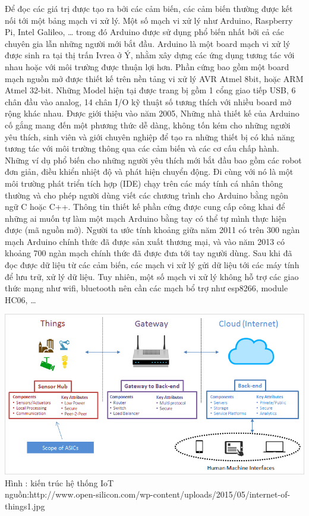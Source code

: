 Để đọc các giá trị được tạo ra bởi các cảm biến, các cảm biến thường được kết nối tới một bảng mạch vi xử lý. Một số mạch vi xử lý như Arduino, Raspberry Pi, Intel Galileo, … trong đó Arduino được sử dụng phổ biến nhất bởi cả các chuyên gia lẫn những người mới bắt đầu. Arduino là một board mạch vi xử lý được sinh ra tại thị trấn Ivrea ở Ý, nhằm xây dựng các ứng dụng tương tác với nhau hoặc với môi trường được thuận lợi hơn. Phần cứng bao gồm một board mạch nguồn mở được thiết kế trên nền tảng vi xử lý AVR Atmel 8bit, hoặc ARM Atmel 32-bit. Những Model hiện tại được trang bị gồm 1 cổng giao tiếp USB, 6 chân đầu vào analog, 14 chân I/O kỹ thuật số tương thích với nhiều board mở rộng khác nhau. Được giới thiệu vào năm 2005, Những nhà thiết kế của Arduino cố gắng mang đến một phương thức dễ dàng, không tốn kém cho những người yêu thích, sinh viên và giới chuyên nghiệp để tạo ra những thiết bị có khả năng tương tác với môi trường thông qua các cảm biến và các cơ cấu chấp hành. Những ví dụ phổ biến cho những người yêu thích mới bắt đầu bao gồm các robot đơn giản, điều khiển nhiệt độ và phát hiện chuyển động. Đi cùng với nó là một môi trường phát triển tích hợp (IDE) chạy trên các máy tính cá nhân thông thường và cho phép người dùng viết các chương trình cho Arduino bằng ngôn ngữ C hoặc C++. Thông tin thiết kế phần cứng được cung cấp công khai để những ai muốn tự làm một mạch Arduino bằng tay có thể tự mình thực hiện được (mã nguồn mở). Người ta ước tính khoảng giữa năm 2011 có trên 300 ngàn mạch Arduino chính thức đã được sản xuất thương mại, và vào năm 2013 có khoảng 700 ngàn mạch chính thức đã được đưa tới tay người dùng. 
Sau khi đã đọc được dữ liệu từ các cảm biến, các mạch vi xử lý gửi dữ liệu tới các máy tính để lưu trữ, xử lý dữ liệu. Tuy nhiên, một số mạch vi xử lý không hỗ trợ các giao thức mạng như wifi, bluetooth nên cần các mạch bổ trợ như esp8266, module HC06, …

\begin{center}
	\includegraphics[scale=0.6]{image/internet-of-things1}
	Hình  : kiến trúc hệ thống IoT \\
	nguồn:http://www.open-silicon.com/wp-content/uploads/2015/05/internet-of-things1.jpg

\end{center}


